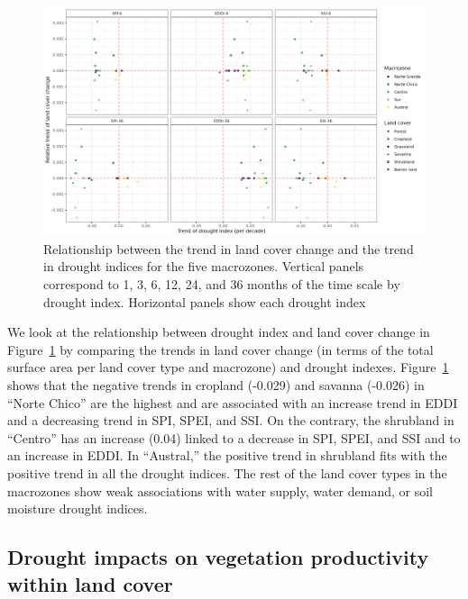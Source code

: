 \documentclass[
  authoryear,
  preprint,
  3p,
  onecolumn]{elsarticle}
\begin{document}
\begin{figure}[!ht]

{\centering \includegraphics{../output/figs/points_landcover_drought_indices_trend_and_time_scale.png}

}

\caption{\label{fig-TrendsLandDrought}Relationship between the trend in
land cover change and the trend in drought indices for the five
macrozones. Vertical panels correspond to 1, 3, 6, 12, 24, and 36 months
of the time scale by drought index. Horizontal panels show each drought
index}

\end{figure}

We look at the relationship between drought index and land cover change
in Figure~\ref{fig-TrendsLandDrought} by comparing the trends in land
cover change (in terms of the total surface area per land cover type and
macrozone) and drought indexes. Figure~\ref{fig-TrendsLandDrought} shows
that the negative trends in cropland (-0.029) and savanna (-0.026) in
``Norte Chico'' are the highest and are associated with an increase
trend in EDDI and a decreasing trend in SPI, SPEI, and SSI. On the
contrary, the shrubland in ``Centro'' has an increase (0.04) linked to a
decrease in SPI, SPEI, and SSI and to an increase in EDDI. In
``Austral,'' the positive trend in shrubland fits with the positive
trend in all the drought indices. The rest of the land cover types in
the macrozones show weak associations with water supply, water demand,
or soil moisture drought indices.

\hypertarget{drought-impacts-on-vegetation-productivity-within-land-cover-1}{%
\subsection{Drought impacts on vegetation productivity within land
cover}\label{drought-impacts-on-vegetation-productivity-within-land-cover-1}}
\end{document}
